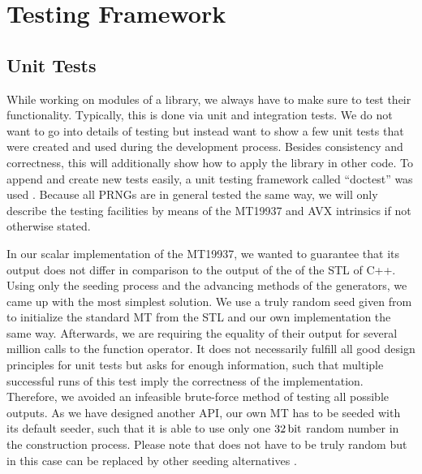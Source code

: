 \documentclass{stdlocal}
\begin{document}
\section{Testing Framework} %
\label{sec:testing_framework}

  \subsection{Unit Tests} %
  \label{sub:unit_tests}
    While working on modules of a library, we always have to make sure to test their functionality.
    Typically, this is done via unit and integration tests.
    We do not want to go into details of testing but instead want to show a few unit tests that were created and used during the development process.
    Besides consistency and correctness, this will additionally show how to apply the library in other code.
    To append and create new tests easily, a unit testing framework called \enquote{doctest} was used \autocite{doctest}.
    Because all PRNGs are in general tested the same way, we will only describe the testing facilities by means of the MT19937 and AVX intrinsics if not otherwise stated.

    In our scalar implementation of the MT19937, we wanted to guarantee that its output does not differ in comparison to the output of the  of the STL of C++.
    Using only the seeding process and the advancing methods of the generators, we came up with the most simplest solution.
    We use a truly random seed given from  to initialize the standard MT from the STL and our own implementation the same way.
    Afterwards, we are requiring the equality of their output for several million calls to the function operator.
    It does not necessarily fulfill all good design principles for unit tests but asks for enough information, such that multiple successful runs of this test imply the correctness of the implementation.
    Therefore, we avoided an infeasible brute-force method of testing all possible outputs.
    As we have designed another API, our own MT has to be seeded with its default seeder, such that it is able to use only one $32\, \mathrm{bit}$ random number in the construction process.
    Please note that  does not have to be truly random \autocite{oneill-blog-rd,oneill-blog-seeding-surprises} but in this case can be replaced by other seeding alternatives \autocite{oneill-blog-seed-entropy}.
\end{document}
